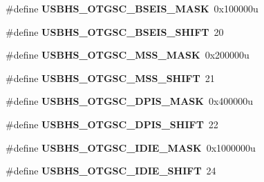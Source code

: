 \begin{DoxyCompactItemize}
\item 
\hypertarget{group___u_s_b_h_s___register___masks_ga287357b6ecb6a9418aa1e628aa799008}{}\#define {\bfseries U\+S\+B\+H\+S\+\_\+\+O\+T\+G\+S\+C\+\_\+\+B\+S\+E\+I\+S\+\_\+\+M\+A\+S\+K}~0x100000u\label{group___u_s_b_h_s___register___masks_ga287357b6ecb6a9418aa1e628aa799008}

\item 
\hypertarget{group___u_s_b_h_s___register___masks_ga6aa3795a46cf3831eb85006e74a13d18}{}\#define {\bfseries U\+S\+B\+H\+S\+\_\+\+O\+T\+G\+S\+C\+\_\+\+B\+S\+E\+I\+S\+\_\+\+S\+H\+I\+F\+T}~20\label{group___u_s_b_h_s___register___masks_ga6aa3795a46cf3831eb85006e74a13d18}

\item 
\hypertarget{group___u_s_b_h_s___register___masks_ga1737478607d93760b12b2d6d82a3c7ea}{}\#define {\bfseries U\+S\+B\+H\+S\+\_\+\+O\+T\+G\+S\+C\+\_\+\+M\+S\+S\+\_\+\+M\+A\+S\+K}~0x200000u\label{group___u_s_b_h_s___register___masks_ga1737478607d93760b12b2d6d82a3c7ea}

\item 
\hypertarget{group___u_s_b_h_s___register___masks_ga8f8d8f319644a15c8a8541bce67ded93}{}\#define {\bfseries U\+S\+B\+H\+S\+\_\+\+O\+T\+G\+S\+C\+\_\+\+M\+S\+S\+\_\+\+S\+H\+I\+F\+T}~21\label{group___u_s_b_h_s___register___masks_ga8f8d8f319644a15c8a8541bce67ded93}

\item 
\hypertarget{group___u_s_b_h_s___register___masks_gab3ce6bf548690217da4b28a4c0e678b5}{}\#define {\bfseries U\+S\+B\+H\+S\+\_\+\+O\+T\+G\+S\+C\+\_\+\+D\+P\+I\+S\+\_\+\+M\+A\+S\+K}~0x400000u\label{group___u_s_b_h_s___register___masks_gab3ce6bf548690217da4b28a4c0e678b5}

\item 
\hypertarget{group___u_s_b_h_s___register___masks_gaaaf7ce10a29e36bb683c397aec49b765}{}\#define {\bfseries U\+S\+B\+H\+S\+\_\+\+O\+T\+G\+S\+C\+\_\+\+D\+P\+I\+S\+\_\+\+S\+H\+I\+F\+T}~22\label{group___u_s_b_h_s___register___masks_gaaaf7ce10a29e36bb683c397aec49b765}

\item 
\hypertarget{group___u_s_b_h_s___register___masks_ga1af40bcdb3aa6466f288fcf3c0c07d90}{}\#define {\bfseries U\+S\+B\+H\+S\+\_\+\+O\+T\+G\+S\+C\+\_\+\+I\+D\+I\+E\+\_\+\+M\+A\+S\+K}~0x1000000u\label{group___u_s_b_h_s___register___masks_ga1af40bcdb3aa6466f288fcf3c0c07d90}

\item 
\hypertarget{group___u_s_b_h_s___register___masks_ga2d5c00cdd135c92059c365f0183c14ff}{}\#define {\bfseries U\+S\+B\+H\+S\+\_\+\+O\+T\+G\+S\+C\+\_\+\+I\+D\+I\+E\+\_\+\+S\+H\+I\+F\+T}~24\label{group___u_s_b_h_s___register___masks_ga2d5c00cdd135c92059c365f0183c14ff}


\end{DoxyCompactItemize}
